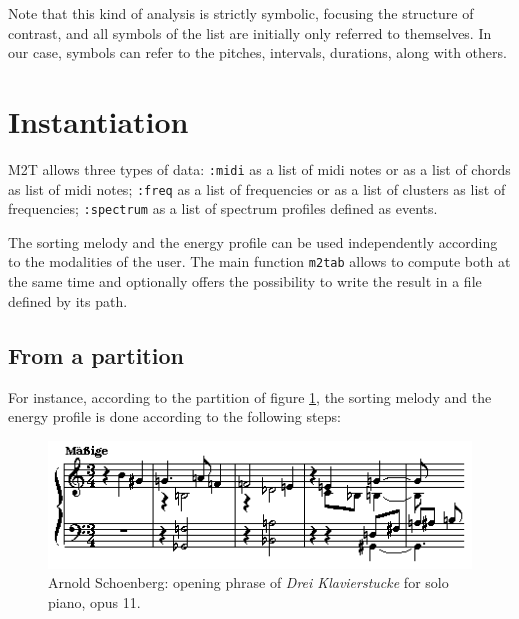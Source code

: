 \bigskip 

Note that this kind of analysis is strictly symbolic, focusing the structure of contrast, and all symbols of the list are initially only referred to themselves. In our case, symbols can refer to the pitches, intervals, durations, along with others.

\section{Instantiation}

M2T allows three types of data: \texttt{:midi} as a list of midi notes or as a list of chords as list of midi notes; \texttt{:freq} as a list of frequencies or as a list of clusters as list of frequencies; \texttt{:spectrum} as a list of spectrum profiles defined as events.

The sorting melody and the energy profile can be used independently according to the modalities of the user. The main function \texttt{m2tab} allows to compute both at the same time and optionally offers the possibility to write the result in a file defined by its path.

\subsection{From a partition}

For instance, according to the partition of figure \ref{fig:op11}, the sorting melody and the energy profile is done according to the following steps:

\begin{figure}[!hbt]
	\begin{center}
		\includegraphics[scale=0.6]{img/2311}
		\caption{Arnold Schoenberg: opening phrase of \textit{Drei Klavierstucke} for solo piano, opus 11.}
		\label{fig:op11}
	\end{center}
\end{figure}

